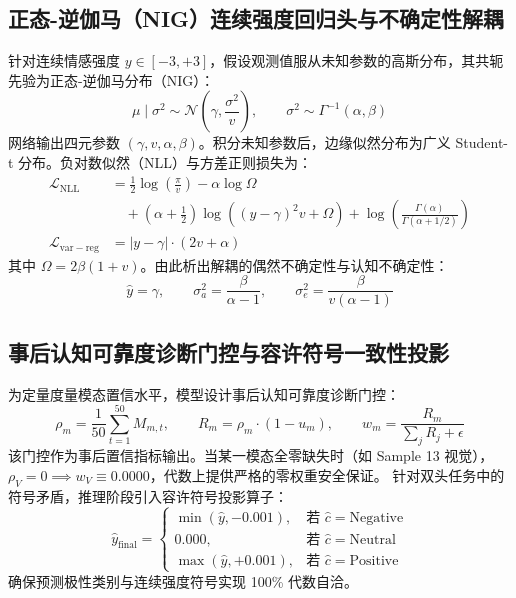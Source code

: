 \documentclass{huawei-mcm}
\begin{document}
\subsection{正态-逆伽马（NIG）连续强度回归头与不确定性解耦}
针对连续情感强度 $y \in [-3, +3]$，假设观测值服从未知参数的高斯分布，其共轭先验为正态-逆伽马分布（NIG）\cite{amini2020deep}：
\begin{equation}
  \mu \mid \sigma^2 \sim \mathcal{N}\left(\gamma, \frac{\sigma^2}{v}\right), \qquad \sigma^2 \sim \Gamma^{-1}(\alpha, \beta)
\end{equation}
网络输出四元参数 $(\gamma, v, \alpha, \beta)$。积分未知参数后，边缘似然分布为广义 Student-t 分布。负对数似然（NLL）与方差正则损失为：
\begin{align}
  \mathcal{L}_{\mathrm{NLL}} &= \frac{1}{2} \log\left(\frac{\pi}{v}\right) - \alpha \log \Omega \nonumber \\
  &\quad + \left(\alpha + \frac{1}{2}\right) \log\left((y - \gamma)^2 v + \Omega\right) + \log\left(\frac{\Gamma(\alpha)}{\Gamma(\alpha + 1/2)}\right) \\
  \mathcal{L}_{\mathrm{var-reg}} &= |y - \gamma| \cdot (2v + \alpha)
\end{align}
其中 $\Omega = 2\beta(1 + v)$。由此析出解耦的偶然不确定性与认知不确定性：
\begin{equation}
  \hat{y} = \gamma, \qquad \sigma_a^2 = \frac{\beta}{\alpha - 1}, \qquad \sigma_e^2 = \frac{\beta}{v(\alpha - 1)}
\end{equation}

\subsection{事后认知可靠度诊断门控与容许符号一致性投影}
为定量度量模态置信水平，模型设计事后认知可靠度诊断门控：
\begin{equation}
  \rho_m = \frac{1}{50} \sum_{t=1}^{50} M_{m, t}, \qquad R_m = \rho_m \cdot (1 - u_m), \qquad w_m = \frac{R_m}{\sum_{j} R_j + \epsilon}
\end{equation}
该门控作为事后置信指标输出。当某一模态全零缺失时（如 Sample 13 视觉），$\rho_V = 0 \implies w_V \equiv 0.0000$，代数上提供严格的零权重安全保证。
针对双头任务中的符号矛盾，推理阶段引入容许符号投影算子：
\begin{equation}
  \hat{y}_{\mathrm{final}} = \begin{cases}
    \min(\hat{y}, -0.001), & \text{若 } \hat{c} = \text{Negative} \\
    0.000, & \text{若 } \hat{c} = \text{Neutral} \\
    \max(\hat{y}, +0.001), & \text{若 } \hat{c} = \text{Positive}
  \end{cases}
\end{equation}
确保预测极性类别与连续强度符号实现 100\% 代数自洽。
\end{document}
